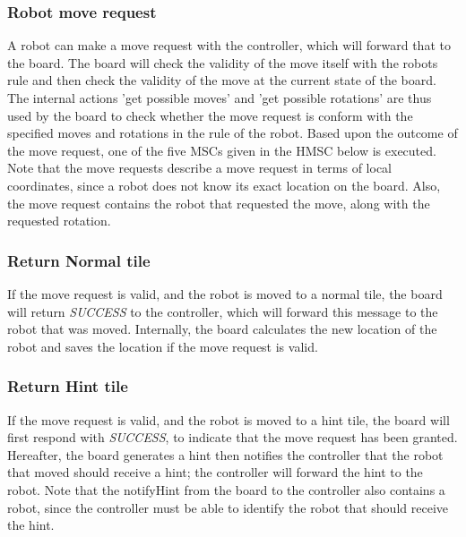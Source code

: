 	\subsubsection{Robot move request}
	\begin{minipage}{\linewidth}
		A robot can make a move request with the controller, which will forward that to the board. The board will check the validity of the move itself with the robots rule and then check the validity of the move at the current state of the board. The internal actions 'get possible moves' and 'get possible rotations' are thus used by the board to check whether the move request is conform with the specified moves and rotations in the rule of the robot. Based upon the outcome of the move request, one of the five MSCs given in the HMSC below is executed. \\
Note that the move requests describe a move request in terms of local coordinates, since a robot does not know its exact location on the board. Also, the move request contains the robot that requested the move, along with the requested rotation.

		
    \end{minipage}

	\subsubsection{Return Normal tile}
	\begin{minipage}{\linewidth}
		If the move request is valid, and the robot is moved to a normal tile, the board will return \emph{SUCCESS} to the controller, which will forward this message to the robot that was moved. Internally, the board calculates the new location of the robot and saves the location if the move request is valid.

		
	\end{minipage}

	\subsubsection{Return Hint tile}
	\begin{minipage}{\linewidth}
		If the move request is valid, and the robot is moved to a hint tile, the board will first respond with \emph{SUCCESS}, to indicate that the move request has been granted. Hereafter, the board generates a hint then notifies the controller that the robot that moved should receive a hint; the controller will forward the hint to the robot. Note that the notifyHint from the board to the controller also contains a robot, since the controller must be able to identify the robot that should receive the hint.

		
	\end{minipage}

